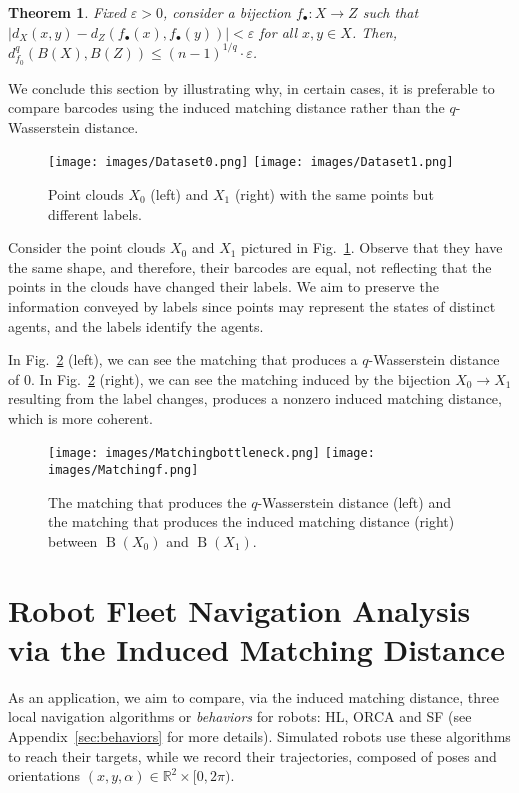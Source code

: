 \documentclass{article}
\DeclareMathOperator{\B}{B}
\newcommand{\scst}{\scriptscriptstyle}
\newcommand{\veps}{\varepsilon}
\newcommand{\dM}{d_{f_0}}
\newcommand{\dX}{d_{\scst X}}
\newcommand{\dZ}{d_{\scst Z}}
\newtheorem{theorem}{Theorem}[section]
\begin{document}
\begin{theorem}\label{th:continuous}
Fixed $\veps>0$, 
   consider a bijection $f_\bullet\colon X\rightarrow Z$ such that $|\dX(x,y)-\dZ(f_\bullet(x), f_\bullet(y))| < \veps$ for all $x,y\in X$.
    Then, 
    $\dM^q(B(X), B(Z)) \leq (n
     - 1)^{1/q} \cdot \veps$.
\end{theorem}

We conclude this section by illustrating why, in certain cases, it is preferable to compare barcodes using the induced matching distance rather than the $q$-Wasserstein distance. 

\begin{figure}[ht!]
  \texttt{[image: images/Dataset0.png]}
   \texttt{[image: images/Dataset1.png]}
    \caption{
  Point clouds $X_0$ (left) and $X_1$ (right) with the same points but different labels.
   }
    \label{fig:datasets}
\end{figure}

Consider the point clouds $X_0$ and $X_1$  pictured in Fig.~\ref{fig:datasets}. 
Observe that they have the same shape, and therefore, their barcodes are equal, not reflecting that  the points 
in the clouds have changed 
their labels. 
We aim to preserve the information conveyed by labels since points may represent the states of distinct agents, and the labels identify the agents.


In Fig.~\ref{fig:matchings} (left), we can 
 see the matching that produces
a $q$-Wasserstein distance of 0.  
In Fig.~\ref{fig:matchings} (right),
 we can see the matching induced by the bijection $X_0\to X_1$  resulting from the label changes, produces 
a nonzero induced matching distance, which is more coherent.

\begin{figure}[ht!]
 \texttt{[image: images/Matchingbottleneck.png]}
  \texttt{[image: images/Matchingf.png]}
    \caption{
The matching that produces the $q$-Wasserstein distance (left) and the matching that produces the induced matching distance (right) between $\B(X_0)$ and $\B(X_1)$.
 }
    \label{fig:matchings}
\end{figure}

\section{Robot Fleet Navigation Analysis via the Induced Matching Distance}

As an application, we aim to compare, via the induced matching distance,
three local navigation algorithms or \emph{behaviors} for robots: HL, ORCA and SF (see Appendix~\ref{sec:behaviors} for more details).
Simulated robots use these algorithms to reach their targets, while we record their trajectories, composed of 
poses and orientations $(x, y, \alpha)\in 
\mathbb{R}^2 \times [0,2\pi)$.
\end{document}
